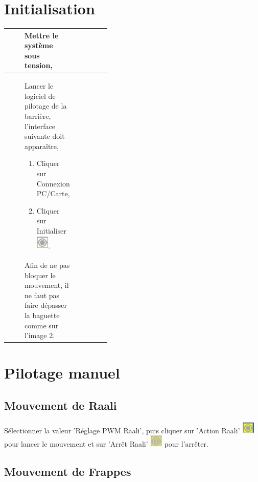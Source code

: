 

\section{Initialisation}

\begin{tabular}{|Ep{0.4\linewidth}|p{.5\linewidth}|}
\hline
& Mettre le système sous tension,
&\tabularnewline\hline
& Lancer le logiciel de pilotage de la barrière, l'interface suivante doit apparaître,
\begin{enumerate}
 \item Cliquer sur Connexion PC/Carte,
 \item Cliquer sur Initialiser \includegraphics[width=0.6cm]{img/robot_jockey_ico_02}.
\end{enumerate}
&\raisebox{-0.9\totalheight}{\def\svgwidth{\linewidth}
 } ~\ \tabularnewline\hline
& Afin de ne pas bloquer le mouvement, il ne faut pas faire dépasser la baguette comme sur l'image 2. 
&\tabularnewline\hline
\end{tabular}

\section{Pilotage manuel}

\subsection{Mouvement de Raali}

Sélectionner la valeur 'Réglage PWM Raali', puis cliquer sur 'Action Raali' \includegraphics[width=0.6cm]{img/robot_jockey_ico_03} pour lancer le mouvement et sur 'Arrêt Raali' \includegraphics[width=0.6cm]{img/robot_jockey_ico_04} pour l'arrêter.

\subsection{Mouvement de Frappes}

